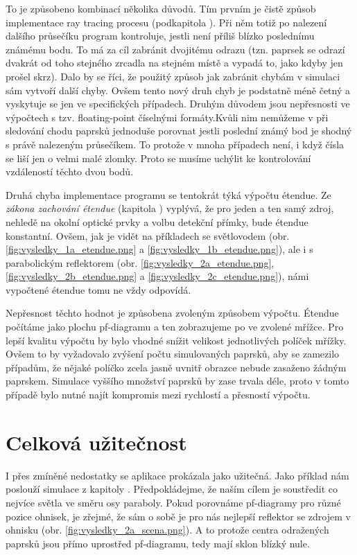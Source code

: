 To je způsobeno kombinací několika důvodů. Tím prvním je čistě způsob implementace ray tracing procesu (podkapitola ). Při něm totiž po nalezení dalšího průsečíku program kontroluje, jestli není příliš blízko poslednímu známému bodu. To má za cíl zabránit dvojitému odrazu (tzn. paprsek se odrazí dvakrát od toho stejného zrcadla na stejném místě a vypadá to, jako kdyby jen prošel skrz). Dalo by se říci, že použitý způsob jak zabránit chybám v simulaci sám vytvoří další chyby. Ovšem tento nový druh chyb je podstatně méně četný a vyskytuje se jen ve specifických případech. Druhým důvodem jsou nepřesnosti ve výpočtech s tzv. floating-point číselnými formáty.\src Kvůli nim nemůžeme v při sledování chodu paprsků jednoduše porovnat jestli poslední známý bod je shodný s právě nalezeným průsečíkem. To protože v mnoha případech není, i když čísla se liší jen o velmi malé zlomky. Proto se musíme uchýlit ke kontrolování vzdáleností těchto dvou bodů.

Druhá chyba implementace programu se tentokrát týká výpočtu étendue. Ze \emph{zákona zachování étendue} (kapitola ) vyplývá, že pro jeden a ten samý zdroj, nehledě na okolní optické prvky a volbu detekční přímky, bude étendue konstantní. Ovšem, jak je vidět na příkladech se světlovodem (obr. \ref{fig:vysledky_1a_etendue.png} a \ref{fig:vysledky_1b_etendue.png}), ale i s parabolickým reflektorem (obr. \ref{fig:vysledky_2a_etendue.png}, \ref{fig:vysledky_2b_etendue.png} a \ref{fig:vysledky_2c_etendue.png}), námi vypočtené étendue tomu ne vždy odpovídá.

Nepřesnost těchto hodnot je způsobena zvoleným způsobem výpočtu. Étendue počítáme jako plochu pf-diagramu a ten zobrazujeme po ve zvolené mřížce. Pro lepší kvalitu výpočtu by bylo vhodné snížit velikost jednotlivých políček mřížky. Ovšem to by vyžadovalo zvýšení počtu simulovaných paprsků, aby se zamezilo případům, že nějaké políčko zcela jasně uvnitř obrazce nebude zasaženo žádným paprskem. Simulace vyššího množství paprsků by zase trvala déle, proto v tomto případě bylo nutné najít kompromis mezi rychlostí a přesností výpočtu.


\section{Celková užitečnost}

I přes zmíněné nedostatky se aplikace prokázala jako užitečná. Jako příklad nám poslouží simulace z kapitoly . Předpokládejme, že naším cílem je soustředit co nejvíce světla ve směru osy paraboly. Pokud porovnáme pf-diagramy pro různé pozice ohnisek, je zřejmé, že sám o sobě je pro nás nejlepší reflektor se zdrojem v ohnisku (obr. \ref{fig:vysledky_2a_scena.png}). A to protože centra odražených paprsků jsou přímo uprostřed pf-diagramu, tedy mají sklon blízký nule.

